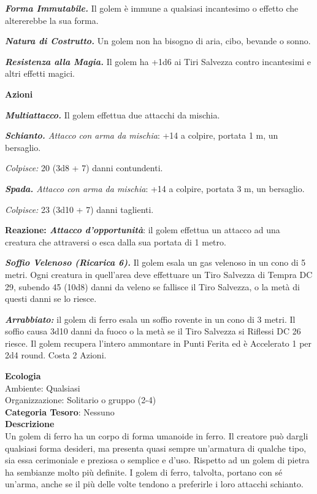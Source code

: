 \begin{multicols}{2}
{\emph{\textbf{Forma Immutabile.}} Il golem è immune a qualsiasi incantesimo o effetto che altererebbe la sua forma.

\emph{\textbf{Natura di Costrutto.}} Un golem non ha bisogno di aria, cibo, bevande o sonno.

\emph{\textbf{Resistenza alla Magia.}} Il golem ha +1d6 ai Tiri Salvezza contro incantesimi e altri effetti magici.

\textbf{Azioni}

\emph{\textbf{Multiattacco.}} Il golem effettua due attacchi da mischia.

\emph{\textbf{Schianto.} Attacco con arma da mischia}: +14 a colpire, portata 1 m, un bersaglio.

\emph{Colpisce:} 20 (3d8 + 7) danni contundenti.

\emph{\textbf{Spada.} Attacco con arma da mischia}: +14 a colpire, portata 3 m, un bersaglio.

\emph{Colpisce:} 23 (3d10 + 7) danni taglienti.

\textbf{Reazione: \emph{Attacco d'opportunità}}: il golem effettua un attacco ad una creatura che attraversi o esca dalla sua portata di 1 metro.

\emph{\textbf{Soffio Velenoso (Ricarica 6).}} Il golem esala un gas velenoso in un cono di 5 metri. Ogni creatura in quell'area deve effettuare un Tiro Salvezza di Tempra DC 29, subendo 45 (10d8) danni da veleno se fallisce il Tiro Salvezza, o la metà di questi danni se lo riesce.

\emph{\textbf{Arrabbiato:}} il golem di ferro esala un soffio rovente in un cono di 3 metri. Il soffio causa 3d10 danni da fuoco o la metà se il Tiro Salvezza si Riflessi DC 26 riesce. Il golem recupera l'intero ammontare in Punti Ferita ed è Accelerato 1 per 2d4 round. Costa 2 Azioni.

\textbf{Ecologia}\\
Ambiente: Qualsiasi\\
Organizzazione: Solitario o gruppo (2-4)\\
\textbf{Categoria Tesoro}: Nessuno\\
\textbf{Descrizione}\\
Un golem di ferro ha un corpo di forma umanoide in ferro. Il creatore può dargli qualsiasi forma desideri, ma presenta quasi sempre un'armatura di qualche tipo, sia essa cerimoniale e preziosa o semplice e d'uso. Rispetto ad un golem di pietra ha sembianze molto più definite. I golem di ferro, talvolta, portano con sé un'arma, anche se il più delle volte tendono a preferirle i loro attacchi schianto.

}
\end{multicols}
